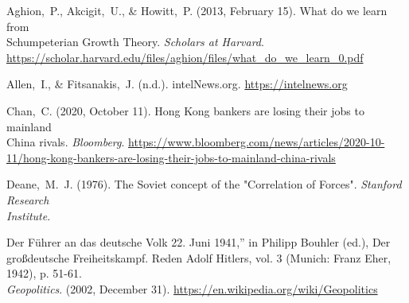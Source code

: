 \documentclass[12pt]{article}
\begin{document}
\begin{flushleft}

  Aghion, P., Akcigit, U., & Howitt, P. (2013, February 15). What do we learn from\\\hspace{.5 in}Schumpeterian Growth Theory. \textit{Scholars at Harvard}.\\\hspace{.5 in} \href{https://scholar.harvard.edu/files/aghion/files/what\_do\_we\_learn\_0.pdf}{https://scholar.harvard.edu/files/aghion/files/what\_do\_we\_learn\_0.pdf}\\
  \vspace{5pt}

  Allen, I., & Fitsanakis, J. (n.d.). intelNews.org. \href{https://intelnews.org}{https://intelnews.org}\\
  \vspace{5pt}

  Chan, C. (2020, October 11). Hong Kong bankers are losing their jobs to mainland \\\hspace{.5 in}China rivals. \textit{Bloomberg}. \href{https://www.bloomberg.com/news/articles/2020-10-11/hong-kong-bankers-are-losing-their-jobs-to-mainland-china-rivals}{https://www.bloomberg.com/news/articles/2020-10-\\\hspace{.5 in}11/hong-kong-bankers-are-losing-their-jobs-to-mainland-china-rivals}\\
  \vspace{5pt}

  Deane, M. J. (1976). The Soviet concept of the "Correlation of Forces". \textit{Stanford Research\\\hspace{.5 in} Institute}.\\
  \vspace{5pt}

  Der Führer an das deutsche Volk 22. Juni 1941,” in Philipp Bouhler (ed.), Der \\\hspace{.5 in}großdeutsche Freiheitskampf. Reden Adolf Hitlers, vol. 3 (Munich: Franz Eher,\\\hspace{.5 in} 1942), p. 51-61.\\

  \textit{Geopolitics}. (2002, December 31). \href{https://en.wikipedia.org/wiki/Geopolitics}{https://en.wikipedia.org/wiki/Geopolitics}\\
  \vspace{5pt}


\end{flushleft}
\end{document}

